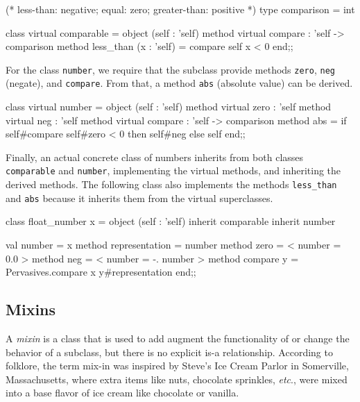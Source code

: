 \begin{ocaml}
(* less-than: negative; equal: zero; greater-than: positive *)
type comparison = int

class virtual comparable =
object (self : 'self)
   method virtual compare : 'self -> comparison
   method less_than (x : 'self) = compare self x < 0
end;;
\end{ocaml}
%
For the class \hbox{\lstinline/number/}, we require that the subclass provide
methods \hbox{\lstinline/zero/}, \hbox{\lstinline/neg/} (negate), and \hbox{\lstinline/compare/}.  From that, a
method \hbox{\lstinline/abs/} (absolute value) can be derived.

\begin{ocaml}
class virtual number =
object (self : 'self)
   method virtual zero : 'self
   method virtual neg : 'self
   method virtual compare : 'self -> comparison
   method abs =
      if self#compare self#zero < 0 then
         self#neg
      else
         self
end;;
\end{ocaml}
%
Finally, an actual concrete class of numbers inherits from both classes \hbox{\lstinline/comparable/}
and \hbox{\lstinline/number/}, implementing the virtual methods, and inheriting the derived methods.  The
following class also implements the methods \hbox{\lstinline/less_than/} and \hbox{\lstinline/abs/}
because it inherits them from the virtual superclasses.

\begin{ocaml}
class float_number x =
object (self : 'self)
   inherit comparable
   inherit number

   val number = x
   method representation = number
   method zero = {< number = 0.0 >}
   method neg = {< number = -. number >}
   method compare y = Pervasives.compare x y#representation
end;;
\end{ocaml}

\subsection{Mixins}

A \emph{mixin} is a class that is used to add augment the functionality of or
change the behavior of a subclass, but there is no explicit is-a relationship.  According to
folklore, the term mix-in was inspired by Steve's Ice Cream Parlor in Somerville, Massachusetts,
where extra items like nuts, chocolate sprinkles, \emph{etc}., were mixed into a base flavor of ice
cream like chocolate or vanilla.

